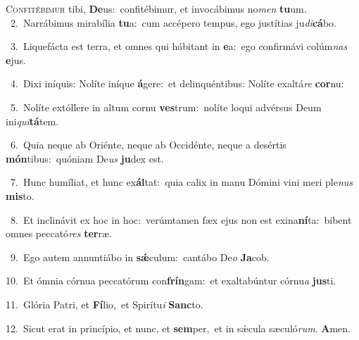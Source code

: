 \lettrine{\initial\textcolor{\initialcolor}{C}}{onfitébimur} tibi, \textbf{De}\-us:~\star confitébimur, et invocábimus no\textit{men} \textbf{tu}\-um.\\
{\numbfont\textcolor{\numbcolor}{~2.}}~Narrábimus mirabília \textbf{tu}\-a:~\star cum accépero tempus, ego justítias ju\-\textit{di}\-\textbf{cá}bo.\par
{\numbfont\textcolor{\numbcolor}{~3.}}~Liquefácta est terra, et omnes qui hábitant in \textbf{e}\-a:~\star ego confirmávi colúm\textit{nas} \textbf{e}\-jus.\par
{\numbfont\textcolor{\numbcolor}{~4.}}~Dixi iníquis: Nolíte iníque \textbf{á}\-gere:~\star et delinquéntibus: Nolíte exaltá\textit{re} \textbf{cor}\-nu:\par
{\numbfont\textcolor{\numbcolor}{~5.}}~Nolíte extóllere in altum cornu \textbf{ves}\-trum:~\star nolíte loqui advérsus Deum ini\-\textit{qui}\-\textbf{tá}tem.\par
{\numbfont\textcolor{\numbcolor}{~6.}}~Quia neque ab Oriénte, neque ab Occidénte, neque a desértis \textbf{món}\-tibus:~\star quóniam De\textit{us} \textbf{ju}\-dex est.\par
{\numbfont\textcolor{\numbcolor}{~7.}}~Hunc humíliat, et hunc ex\-\textbf{ál}\-tat:~\star quia calix in manu Dómini vini meri ple\textit{nus} \textbf{mis}\-to.\par
{\numbfont\textcolor{\numbcolor}{~8.}}~Et inclinávit ex hoc in hoc:~\dagger verúmtamen fæx ejus non est exina\-\textbf{ní}\-ta:~\star bibent omnes peccató\textit{res} \textbf{ter}\-ræ.\par
{\numbfont\textcolor{\numbcolor}{~9.}}~Ego autem annuntiábo in \textbf{sǽ}\-culum:~\star cantábo De\textit{o} \textbf{Ja}\-cob.\par
{\numbfont\textcolor{\numbcolor}{10.}}~Et ómnia córnua peccatórum con\-\textbf{frín}\-gam:~\star et exaltabúntur córnu\textit{a} \textbf{jus}\-ti.\par
{\numbfont\textcolor{\numbcolor}{11.}}~Glória Patri, et \textbf{Fí}\-lio,~\star et Spirítu\textit{i} \textbf{Sanc}\-to.\par
{\numbfont\textcolor{\numbcolor}{12.}}~Sicut erat in princípio, et nunc, et \textbf{sem}\-per,~\star et in sǽcula sæculó\-\textit{rum}\-. \textbf{A}\-men.\par
